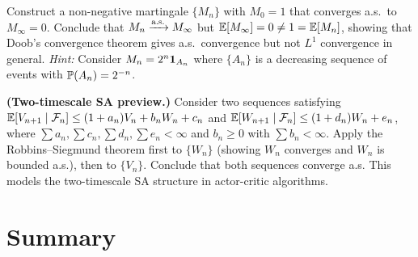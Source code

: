 \documentclass[11pt,a4paper]{article}
\begin{document}
\begin{exercise}[(***)]
\label{ex:doob_not_l1}
Construct a non-negative martingale $\{M_n\}$ with $M_0 = 1$
that converges a.s.\ to $M_\infty = 0$.  Conclude that
$M_n \xrightarrow{\text{a.s.}} M_\infty$ but $\mathbb{E}[M_\infty] = 0 \neq 1 = \mathbb{E}[M_n]$,
showing that Doob's convergence theorem gives a.s.\ convergence
but not $L^1$ convergence in general.
\textit{Hint:} Consider
$M_n = 2^n \mathbf{1}_{A_n}$ where $\{A_n\}$ is a decreasing
sequence of events with $\mathbb{P}(A_n) = 2^{-n}$.
\end{exercise}

\begin{exercise}[(***)]
\label{ex:rs_two_timescale}
\textbf{(Two-timescale SA preview.)}
Consider two sequences satisfying
$\mathbb{E}[V_{n+1} \mid \mathcal{F}_n] \leq (1 + a_n) V_n + b_n W_n
+ c_n$ and
$\mathbb{E}[W_{n+1} \mid \mathcal{F}_n] \leq (1 + d_n) W_n + e_n$,
where $\sum a_n, \sum c_n, \sum d_n, \sum e_n < \infty$ and
$b_n \geq 0$ with $\sum b_n < \infty$.  Apply the
Robbins--Siegmund theorem first to $\{W_n\}$ (showing $W_n$
converges and $W_n$ is bounded a.s.), then to $\{V_n\}$.
Conclude that both sequences converge a.s.  This models the
two-timescale SA structure in actor-critic algorithms.
\end{exercise}


\section{Summary}
\label{sec:summary}
\end{document}
